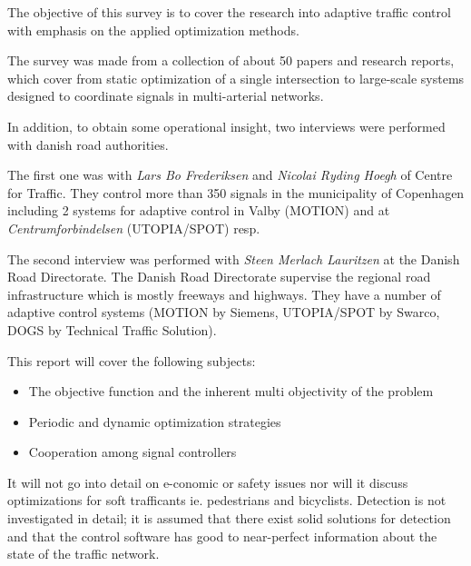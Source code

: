 \label{scope}
The objective of this survey is to cover the research into adaptive traffic control with emphasis on the applied optimization methods.

The survey was made from a collection of about 50 papers and research reports, which cover from static optimization of a single intersection to large-scale systems designed to coordinate signals in multi-arterial networks. 

In addition, to obtain some operational insight, two interviews were performed with danish road authorities. 

The first one was with \textit{Lars Bo Frederiksen} and \textit{Nicolai Ryding Hoegh} of Centre for Traffic. They control more than 350 signals in the municipality of Copenhagen including 2 systems for adaptive control in Valby (MOTION) and at \textit{Centrumforbindelsen} (UTOPIA/SPOT) resp. 

The second interview was performed with \textit{Steen Merlach Lauritzen} at the Danish Road Directorate. The Danish Road Directorate supervise the regional road infrastructure which is mostly freeways and highways. They have a number of adaptive control systems (MOTION by Siemens, UTOPIA/SPOT by Swarco, DOGS by Technical Traffic Solution).

This report will cover the following subjects:

\begin{itemize}
\item The objective function and the inherent multi objectivity of the problem
\item Periodic and dynamic optimization strategies
\item Cooperation among signal controllers
\end{itemize}

It will not go into detail on e-conomic or safety issues nor will it discuss optimizations for soft trafficants ie. pedestrians and bicyclists. Detection is not investigated in detail; it is assumed that there exist solid solutions for detection and that the control software has good to near-perfect information about the state of the traffic network.
